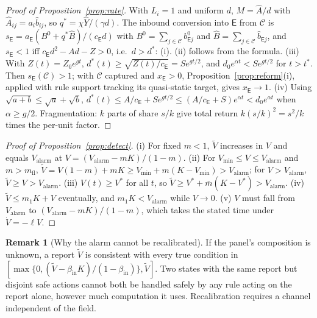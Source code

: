 \documentclass[letterpaper]{article} %
\theoremstyle{definition}
\newtheorem{remark}{Remark}
\newcommand{\dE}{\mathsf{E}}
\newcommand{\cC}{\mathcal{C}}
\newcommand{\Valarm}{V_{\mathrm{alarm}}}
\newcommand{\Vmin}{V_{\min}}
\newcommand{\mfl}{m_{\mathrm{fl}}}
\begin{document}
\begin{proof}[Proof of Proposition~\ref{prop:rate}]
With $L_i=1$ and uniform $d$, $M=\hat A/d$ with $\hat A_{ij}=a_i\hat b_{ij}$, so $q^\ast=\chi\hat Y/(\gamma d)$. The inbound conversion into $\dE$ from $\cC$ is $s_\dE=a_\dE(B^0+q^\ast\hat B)/(c_\dE d)$ with $B^0=\sum_{j\in\cC}b^0_{\dE j}$ and $\hat B=\sum_{j\in\cC}\hat b_{\dE j}$, and $s_\dE<1$ iff $c_\dE d^2-Ad-Z>0$, i.e.\ $d>d^\ast$: (i). (ii) follows from the formula. (iii) With $Z(t)=Z_0e^{gt}$, $d^\ast(t)\ge\sqrt{Z(t)/c_\dE}=Se^{gt/2}$, and $d_0e^{\alpha t}<Se^{gt/2}$ for $t>t^\ast$. Then $s_\dE(\cC)>1$; with $\cC$ captured and $x_\dE>0$, Proposition~\ref{prop:reform}(i), applied with rule support tracking its quasi-static target, gives $x_\dE\to1$. (iv) Using $\sqrt{a+b}\le\sqrt a+\sqrt b$, $d^\ast(t)\le A/c_\dE+Se^{gt/2}\le(A/c_\dE+S)e^{\alpha t}<d_0e^{\alpha t}$ when $\alpha\ge g/2$. Fragmentation: $k$ parts of share $s/k$ give total return $k(s/k)^2=s^2/k$ times the per-unit factor.
\end{proof}

\begin{proof}[Proof of Proposition~\ref{prop:detect}]
(i) For fixed $m<1$, $\tilde V$ increases in $V$ and equals $\Valarm$ at $V=(\Valarm-mK)/(1-m)$. (ii) For $\Vmin\le V\le\Valarm$ and $m>\mfl$, $\tilde V=V(1-m)+mK\ge\Vmin+m(K-\Vmin)>\Valarm$; for $V>\Valarm$, $\tilde V\ge V>\Valarm$. (iii) $V(t)\ge V^\ast$ for all $t$, so $\tilde V\ge V^\ast+\bar m(K-V^\ast)>\Valarm$. (iv) $\tilde V\le m_1K+V$ eventually, and $m_1K<\Valarm$ while $V\to0$. (v) $V$ must fall from $\Valarm$ to $(\Valarm-mK)/(1-m)$, which takes the stated time under $\dot V=-\ell V$.
\end{proof}

\begin{remark}[Why the alarm cannot be recalibrated]\label{rem:indist}
If the panel's composition is unknown, a report $\tilde V$ is consistent with every true condition in $[\max\{0,(\tilde V-\beta_{\mathrm{in}}K)/(1-\beta_{\mathrm{in}})\},\tilde V]$. Two states with the same report but disjoint safe actions cannot both be handled safely by any rule acting on the report alone, however much computation it uses. Recalibration requires a channel independent of the field.
\end{remark}
\end{document}
